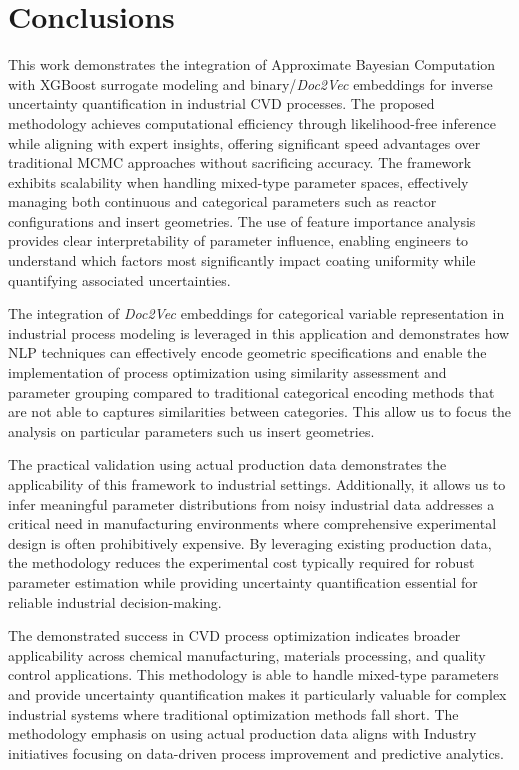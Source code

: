 \documentclass{article}
\begin{document}
	
	\section{Conclusions}\label{sec:Conclusions}
	
	This work demonstrates the integration of Approximate Bayesian Computation with XGBoost surrogate modeling and binary/\textit{Doc2Vec} embeddings for inverse uncertainty quantification in industrial CVD processes. The proposed methodology achieves computational efficiency through likelihood-free inference while aligning with expert insights, offering significant speed advantages over traditional MCMC approaches without sacrificing accuracy. The framework exhibits scalability when handling mixed-type parameter spaces, effectively managing both continuous and categorical parameters such as reactor configurations and insert geometries. The use of feature importance analysis provides clear interpretability of parameter influence, enabling engineers to understand which factors most significantly impact coating uniformity while quantifying associated uncertainties.
	
	The integration of \textit{Doc2Vec} embeddings for categorical variable representation in industrial process modeling is leveraged in this application and demonstrates how NLP techniques can effectively encode geometric specifications and enable the implementation of process optimization using similarity assessment and parameter grouping compared to traditional categorical encoding methods that are not able to captures similarities between categories. This allow us to focus the analysis on particular parameters such us insert geometries.
	
	The practical validation using actual production data demonstrates the applicability of this framework to industrial settings. Additionally, it allows us to infer meaningful parameter distributions from noisy industrial data addresses a critical need in manufacturing environments where comprehensive experimental design is often prohibitively expensive. By leveraging existing production data, the methodology reduces the experimental cost typically required for robust parameter estimation while providing uncertainty quantification essential for reliable industrial decision-making.
	
	The demonstrated success in CVD process optimization indicates broader applicability across chemical manufacturing, materials processing, and quality control applications. This methodology is able to handle mixed-type parameters and provide uncertainty quantification makes it particularly valuable for complex industrial systems where traditional optimization methods fall short. The methodology emphasis on using actual production data aligns with Industry initiatives focusing on data-driven process improvement and predictive analytics.
	
\end{document}

